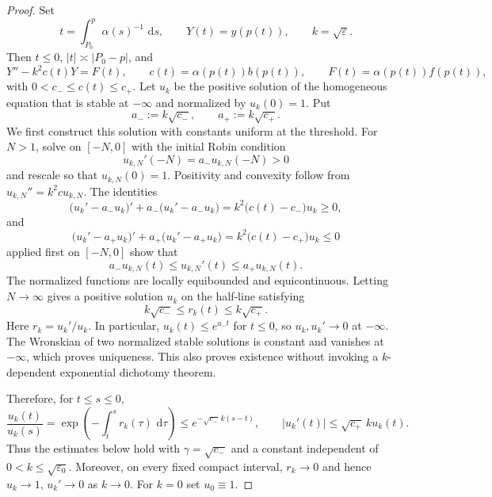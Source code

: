 \documentclass[11pt,reqno]{amsart}
\numberwithin{equation}{section}
\newcommand{\dd}{\,\mathrm{d}}
\theoremstyle{definition}
\theoremstyle{remark}
\begin{document}
\begin{proof}
Set
\[
 t=\int_{P_0}^{p}\alpha(s)^{-1}\,\dd s,
 \qquad Y(t)=y(p(t)),\qquad k=\sqrt\varepsilon.
\]
Then $t\le0$, $|t|\asymp|P_0-p|$, and
\[
 Y''-k^2c(t)Y=F(t),
 \qquad c(t)=\alpha(p(t))b(p(t)),
 \qquad F(t)=\alpha(p(t))f(p(t)),
\]
with $0<c_-\le c(t)\le c_+$.  Let $u_k$ be the positive solution of
the homogeneous equation that is stable at $-\infty$ and normalized by
$u_k(0)=1$.  Put
\[
 a_-:=k\sqrt{c_-},\qquad a_+:=k\sqrt{c_+}.
\]
We first construct this solution with constants uniform at the
threshold.  For $N>1$, solve on $[-N,0]$ with the initial Robin
condition
\[
 u_{k,N}'(-N)=a_-u_{k,N}(-N)>0
\]
and rescale so that $u_{k,N}(0)=1$.  Positivity and convexity follow
from $u_{k,N}''=k^2cu_{k,N}$.  The identities
\[
 \bigl(u_k'-a_-u_k\bigr)'+a_-
 \bigl(u_k'-a_-u_k\bigr)
   =k^2\bigl(c(t)-c_-\bigr)u_k\ge0,
\]
and
\[
 \bigl(u_k'-a_+u_k\bigr)'+a_+
 \bigl(u_k'-a_+u_k\bigr)
   =k^2\bigl(c(t)-c_+\bigr)u_k\le0
\]
applied first on $[-N,0]$ show that
\[
 a_-u_{k,N}(t)\le u_{k,N}'(t)
 \le a_+u_{k,N}(t).
\]
The normalized functions are locally equibounded and equicontinuous.
Letting $N\to\infty$ gives a positive solution $u_k$ on the
half-line satisfying
\[
 k\sqrt{c_-}\le r_k(t)\le k\sqrt{c_+}.
\]
Here $r_k=u_k'/u_k$.  In particular,
$u_k(t)\le e^{a_-t}$ for $t\le0$, so $u_k,u_k'\to0$ at
$-\infty$.  The Wronskian of two normalized stable solutions is
constant and vanishes at $-\infty$, which proves uniqueness.  This
also proves existence without invoking a $k$-dependent exponential
dichotomy theorem.

Therefore, for $t\le s\le0$,
\[
 \frac{u_k(t)}{u_k(s)}
 =\exp\!\left(-\int_t^s r_k(\tau)\,\dd\tau\right)
 \le e^{-\sqrt{c_-}\,k(s-t)},
 \qquad
 |u_k'(t)|\le \sqrt{c_+}\,k u_k(t).
\]
Thus the estimates below hold with
$\gamma=\sqrt{c_-}$ and a constant independent of
$0<k\le\sqrt{\varepsilon_0}$.  Moreover, on every fixed compact
interval, $r_k\to0$ and hence $u_k\to1$, $u_k'\to0$ as $k\to0$.
For $k=0$ set $u_0\equiv1$.


\end{proof}
\end{document}
